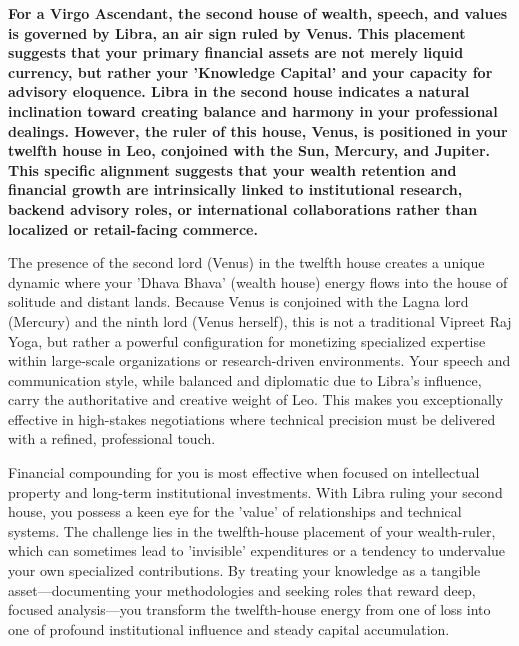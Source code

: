 \label{topic22}

{\fontsize{9.5}{13.8}\selectfont\bfseries\color{DeepSlate} For a Virgo Ascendant, the second house of wealth, speech, and values is governed by Libra, an air sign ruled by Venus. This placement suggests that your primary financial assets are not merely liquid currency, but rather your 'Knowledge Capital' and your capacity for advisory eloquence. Libra in the second house indicates a natural inclination toward creating balance and harmony in your professional dealings. However, the ruler of this house, Venus, is positioned in your twelfth house in Leo, conjoined with the Sun, Mercury, and Jupiter. This specific alignment suggests that your wealth retention and financial growth are intrinsically linked to institutional research, backend advisory roles, or international collaborations rather than localized or retail-facing commerce.}\par\vspace{2mm}

{\fontsize{9}{13}\selectfont The presence of the second lord (Venus) in the twelfth house creates a unique dynamic where your 'Dhava Bhava' (wealth house) energy flows into the house of solitude and distant lands. Because Venus is conjoined with the Lagna lord (Mercury) and the ninth lord (Venus herself), this is not a traditional Vipreet Raj Yoga, but rather a powerful configuration for monetizing specialized expertise within large-scale organizations or research-driven environments. Your speech and communication style, while balanced and diplomatic due to Libra's influence, carry the authoritative and creative weight of Leo. This makes you exceptionally effective in high-stakes negotiations where technical precision must be delivered with a refined, professional touch.}\par\vspace{1.8mm}

{\fontsize{9}{13}\selectfont Financial compounding for you is most effective when focused on intellectual property and long-term institutional investments. With Libra ruling your second house, you possess a keen eye for the 'value' of relationships and technical systems. The challenge lies in the twelfth-house placement of your wealth-ruler, which can sometimes lead to 'invisible' expenditures or a tendency to undervalue your own specialized contributions. By treating your knowledge as a tangible asset---documenting your methodologies and seeking roles that reward deep, focused analysis---you transform the twelfth-house energy from one of loss into one of profound institutional influence and steady capital accumulation.}\par\vspace{1.8mm}

